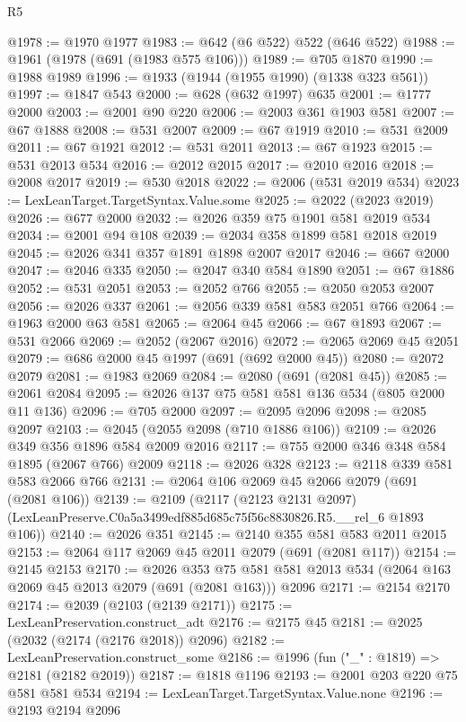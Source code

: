 \begin{lexlean}{R5}
\begin{coremodule}
@1978 := @1970 @1977
@1983 := @642 (@6 @522) @522 (@646 @522)
@1988 := @1961 (@1978 (@691 (@1983 @575 @106)))
@1989 := @705 @1870
@1990 := @1988 @1989
@1996 := @1933 (@1944 (@1955 @1990) (@1338 @323 @561))
@1997 := @1847 @543
@2000 := @628 (@632 @1997) @635
@2001 := @1777 @2000
@2003 := @2001 @90 @220
@2006 := @2003 @361 @1903 @581
@2007 := @67 @1888
@2008 := @531 @2007
@2009 := @67 @1919
@2010 := @531 @2009
@2011 := @67 @1921
@2012 := @531 @2011
@2013 := @67 @1923
@2015 := @531 @2013 @534
@2016 := @2012 @2015
@2017 := @2010 @2016
@2018 := @2008 @2017
@2019 := @530 @2018
@2022 := @2006 (@531 @2019 @534)
@2023 := LexLeanTarget.TargetSyntax.Value.some
@2025 := @2022 (@2023 @2019)
@2026 := @677 @2000
@2032 := @2026 @359 @75 @1901 @581 @2019 @534
@2034 := @2001 @94 @108
@2039 := @2034 @358 @1899 @581 @2018 @2019
@2045 := @2026 @341 @357 @1891 @1898 @2007 @2017
@2046 := @667 @2000
@2047 := @2046 @335
@2050 := @2047 @340 @584 @1890
@2051 := @67 @1886
@2052 := @531 @2051
@2053 := @2052 @766
@2055 := @2050 @2053 @2007
@2056 := @2026 @337
@2061 := @2056 @339 @581 @583 @2051 @766
@2064 := @1963 @2000 @63 @581
@2065 := @2064 @45
@2066 := @67 @1893
@2067 := @531 @2066
@2069 := @2052 (@2067 @2016)
@2072 := @2065 @2069 @45 @2051
@2079 := @686 @2000 @45 @1997 (@691 (@692 @2000 @45))
@2080 := @2072 @2079
@2081 := @1983 @2069
@2084 := @2080 (@691 (@2081 @45))
@2085 := @2061 @2084
@2095 := @2026 @137 @75 @581 @581 @136 @534 (@805 @2000 @11 @136)
@2096 := @705 @2000
@2097 := @2095 @2096
@2098 := @2085 @2097
@2103 := @2045 (@2055 @2098 (@710 @1886 @106))
@2109 := @2026 @349 @356 @1896 @584 @2009 @2016
@2117 := @755 @2000 @346 @348 @584 @1895 (@2067 @766) @2009
@2118 := @2026 @328
@2123 := @2118 @339 @581 @583 @2066 @766
@2131 := @2064 @106 @2069 @45 @2066 @2079 (@691 (@2081 @106))
@2139 := @2109
    (@2117
      (@2123 @2131 @2097)
      (LexLeanPreserve.C0a5a3499edf885d685c75f56c8830826.R5.__rel_6 @1893 @106))
@2140 := @2026 @351
@2145 := @2140 @355 @581 @583 @2011 @2015
@2153 := @2064 @117 @2069 @45 @2011 @2079 (@691 (@2081 @117))
@2154 := @2145 @2153
@2170 := @2026
    @353
    @75
    @581
    @581
    @2013
    @534
    (@2064 @163 @2069 @45 @2013 @2079 (@691 (@2081 @163)))
    @2096
@2171 := @2154 @2170
@2174 := @2039 (@2103 (@2139 @2171))
@2175 := LexLeanPreservation.construct_adt
@2176 := @2175 @45
@2181 := @2025 (@2032 (@2174 (@2176 @2018)) @2096)
@2182 := LexLeanPreservation.construct_some
@2186 := @1996 (fun ("_" : @1819) => @2181 (@2182 @2019))
@2187 := @1818 @1196
@2193 := @2001 @203 @220 @75 @581 @581 @534
@2194 := LexLeanTarget.TargetSyntax.Value.none
@2196 := @2193 @2194 @2096

\end{coremodule}
\end{lexlean}
